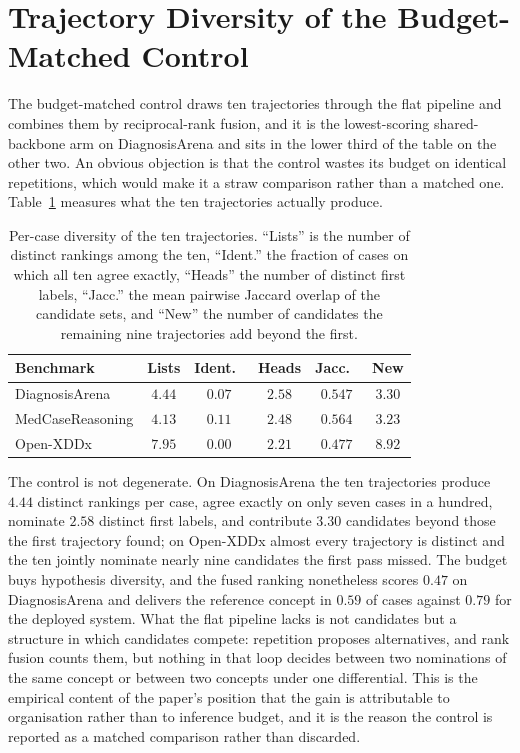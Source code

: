 \documentclass[letterpaper]{article}
\begin{document}
\section{Trajectory Diversity of the Budget-Matched Control}
\label{sec:diversity}

The budget-matched control draws ten trajectories through the flat pipeline and combines them by reciprocal-rank fusion, and it is the lowest-scoring shared-backbone arm on DiagnosisArena and sits in the lower third of the table on the other two.
An obvious objection is that the control wastes its budget on identical repetitions, which would make it a straw comparison rather than a matched one.
Table~\ref{tab:diversity} measures what the ten trajectories actually produce.

\begin{table}[tb]
\centering
\footnotesize
\setlength{\tabcolsep}{3pt}
\begin{tabular}{@{}lccccc@{}}
\toprule
Benchmark & Lists & Ident.\ & Heads & Jacc.\ & New \\
\midrule
DiagnosisArena   & $4.44$ & $0.07$ & $2.58$ & $0.547$ & $3.30$ \\
MedCaseReasoning & $4.13$ & $0.11$ & $2.48$ & $0.564$ & $3.23$ \\
Open-XDDx        & $7.95$ & $0.00$ & $2.21$ & $0.477$ & $8.92$ \\
\bottomrule
\end{tabular}
\caption{Per-case diversity of the ten trajectories. ``Lists'' is the number of distinct rankings among the ten, ``Ident.'' the fraction of cases on which all ten agree exactly, ``Heads'' the number of distinct first labels, ``Jacc.'' the mean pairwise Jaccard overlap of the candidate sets, and ``New'' the number of candidates the remaining nine trajectories add beyond the first.}
\label{tab:diversity}
\end{table}

The control is not degenerate.
On DiagnosisArena the ten trajectories produce $4.44$ distinct rankings per case, agree exactly on only seven cases in a hundred, nominate $2.58$ distinct first labels, and contribute $3.30$ candidates beyond those the first trajectory found; on Open-XDDx almost every trajectory is distinct and the ten jointly nominate nearly nine candidates the first pass missed.
The budget buys hypothesis diversity, and the fused ranking nonetheless scores $0.47$ on DiagnosisArena and delivers the reference concept in $0.59$ of cases against $0.79$ for the deployed system.
What the flat pipeline lacks is not candidates but a structure in which candidates compete: repetition proposes alternatives, and rank fusion counts them, but nothing in that loop decides between two nominations of the same concept or between two concepts under one differential.
This is the empirical content of the paper's position that the gain is attributable to organisation rather than to inference budget, and it is the reason the control is reported as a matched comparison rather than discarded.
\end{document}
